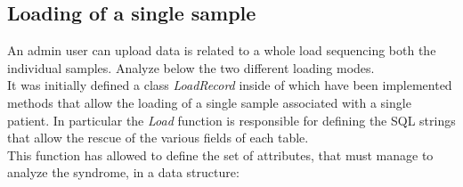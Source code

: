 \documentclass[a4paper]{report}
\begin{document}
\subsection{Loading of a single sample}
An admin user can upload data is related to a whole load sequencing both the individual samples. Analyze below the two different loading modes.\\
It was initially defined a class \textit{LoadRecord} inside of which have been implemented methods that allow the loading of a single sample associated with a single patient. In particular the \textit{Load} function is responsible for defining the SQL strings that allow the rescue of the various fields of each table. \\
This function has allowed to define the set of attributes, that must manage to analyze the syndrome, in a data structure:
\end{document}
